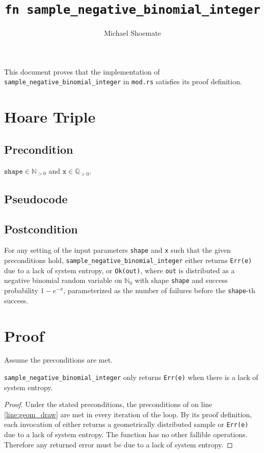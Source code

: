 \documentclass{article}
\title{\texttt{fn sample\_negative\_binomial\_integer}}
\author{Michael Shoemate}
\begin{document}
\maketitle

This document proves that the implementation of \texttt{sample\_negative\_binomial\_integer}
in \texttt{mod.rs} satisfies its proof definition.

\section{Hoare Triple}
\subsection*{Precondition}
$\texttt{shape} \in \mathbb{N}_{>0}$ and $\texttt{x} \in \mathbb{Q}_{>0}$.

\subsection*{Pseudocode}


\subsection*{Postcondition}
\label{postcondition}
For any setting of the input parameters \texttt{shape} and \texttt{x} such that the given preconditions hold,
\texttt{sample\_negative\_binomial\_integer} either returns \texttt{Err(e)} due to a lack of system entropy,
or \texttt{Ok(out)}, where \texttt{out} is distributed as a negative binomial random variable on $\mathbb{N}_0$
with shape \texttt{shape} and success probability $1 - e^{-x}$, parameterized as the number of failures before
the \texttt{shape}-th success.

\section{Proof}
Assume the preconditions are met.

\begin{lemma}
\label{lem:err-e}
\texttt{sample\_negative\_binomial\_integer} only returns \texttt{Err(e)} when there is a lack of system entropy.
\end{lemma}
\begin{proof}
Under the stated preconditions, the preconditions of
on line \ref{line:geom_draw} are met in every iteration of the loop.
By its proof definition, each invocation of
either returns a geometrically distributed sample or \texttt{Err(e)} due to a lack of system entropy.
The function has no other fallible operations. Therefore any returned error must be due to a lack of system entropy.
\end{proof}
\end{document}
